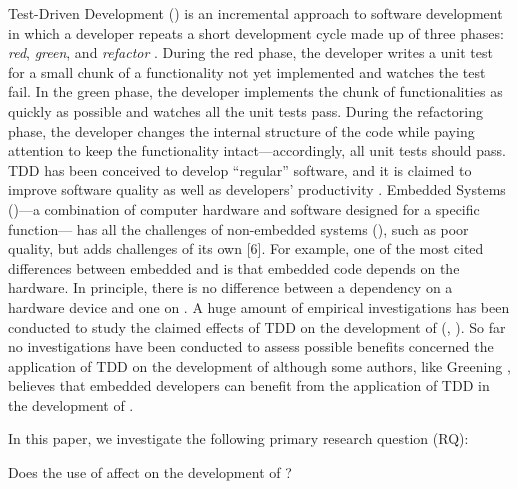 Test-Driven Development (\tdd) is an incremental approach to software development in which a developer repeats a short development cycle made up of three phases: \textit{red}, \textit{green}, and \textit{refactor} \cite{TDDByExample}. During the red phase, the developer writes a unit test for a small chunk of a functionality not yet implemented and watches the test fail. In the green phase, the developer implements the chunk of functionalities as quickly as possible and watches all the unit tests pass. During the refactoring phase, the developer changes the internal structure of the code while paying attention to keep the functionality intact—accordingly, all unit tests should pass. TDD has been conceived to develop “regular” software, and it is claimed to improve software quality as well as developers' productivity \cite{DBLP:reference/se/ErdogmusMJ10}. Embedded Systems (\ess)—a combination of computer hardware and software designed for a specific function— has all the challenges of non-embedded systems (\noess), such as poor quality, but adds challenges of its own [6]. 
For example, one of the most cited differences between embedded and \noess is that embedded code depends on the hardware. In principle, there is no difference between a dependency on a hardware device and one on \noess \cite{TDDEC}. A huge amount of empirical investigations has been conducted to study the claimed effects of TDD on the development of \noess (\eg, \cite{DBLP:journals/software/KaracT18}). So far no investigations have been conducted to assess possible benefits concerned the application of TDD on the development of \ess although some authors, like Greening \cite{TDDEC}, believes that embedded developers can benefit from the application of TDD in the development of \ess.

In this paper, we investigate the following primary research question (RQ):

    \noindent
    Does the use of \tdd affect on the development of \ess?	


